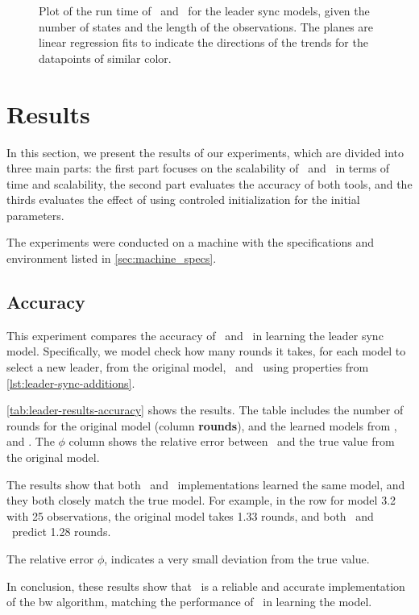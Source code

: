 \begin{figure*}
    \centering
    
    \caption{Plot of the run time of \Jajapy\ and \Cupaal\ for the leader sync models, given the number of states and the length of the observations. The planes are linear regression fits to indicate the directions of the trends for the datapoints of similar color.}
    \label{fig:leader_results}
\end{figure*}


\section{Results}\label{sec:results}
In this section, we present the results of our experiments, which are divided into three main parts: the first part focuses on the scalability of \Jajapy\ and \Cupaal\ in terms of time and scalability, the second part evaluates the accuracy of both tools, and the thirds evaluates the effect of using controled initialization for the initial parameters.

The experiments were conducted on a machine with the specifications and environment listed in \autoref{sec:machine_specs}.

\subsection{Accuracy}\label{subsec:accuracy}
This experiment compares the accuracy of \Cupaal\ and \Jajapy\ in learning the leader sync model.
Specifically, we model check how many rounds it takes, for each model to select a new leader, from the original model, \Jajapy\ and \Cupaal\ using properties from \autoref{lst:leader-sync-additions}.

\autoref{tab:leader-results-accuracy} shows the results.
The table includes the number of rounds for the original model (column \textbf{rounds}), and the learned models from \Jajapy, and \Cupaal.
The $\phi$ column shows the relative error between \Jajapy\ and the true value from the original model.

The results show that both \Cupaal\ and \Jajapy\ implementations learned the same model, and they both closely match the true model.
For example, in the row for model 3.2 with 25 observations, the original model takes 1.33 rounds, and both \Cupaal\ and \Jajapy\ predict 1.28 rounds.

The relative error $\phi$, indicates a very small deviation from the true value.

In conclusion, these results show that \Cupaal\ is a reliable and accurate implementation of the \gls{bw} algorithm, matching the performance of \Jajapy\ in learning the model.

